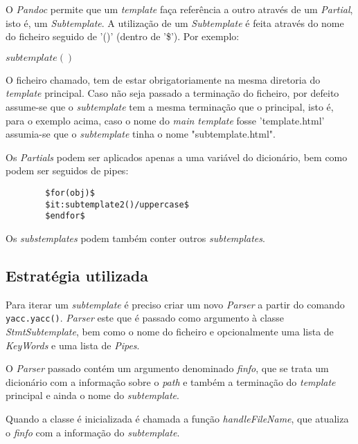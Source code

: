 \documentclass[../relatorio.tex]{subfiles}
\begin{document}
    O \textit{Pandoc} permite que um \textit{template} faça referência a outro
    através de um \textit{Partial}, isto é, um \textit{Subtemplate}. A utilização
    de um \textit{Subtemplate} é feita através do nome do ficheiro seguido de '()'
    (dentro de '\$'). Por exemplo:

    \texttt{$subtemplate()$}

    O ficheiro chamado, tem de estar obrigatoriamente na mesma diretoria do \textit{template}
    principal. Caso não seja passado a terminação do ficheiro, por defeito assume-se que o
    \textit{subtemplate} tem a mesma terminação que o principal, isto é, para o exemplo acima, caso o nome do
    \textit{main template} fosse 'template.html' assumia-se que o \textit{subtemplate} tinha o nome "subtemplate.html".
    
    Os \textit{Partials} podem ser aplicados apenas a uma variável do dicionário, bem como podem ser seguidos de pipes:

    \begin{verbatim}
        $for(obj)$
        $it:subtemplate2()/uppercase$
        $endfor$
    \end{verbatim}

    Os \textit{substemplates} podem também conter outros \textit{subtemplates}.

    \subsection{Estratégia utilizada}

    Para iterar um \textit{subtemplate} é preciso criar um novo \textit{Parser} a partir do
    comando \texttt{yacc.yacc()}. \textit{Parser} este que é passado como argumento
    à classe \textit{StmtSubtemplate}, bem como o nome do ficheiro e opcionalmente uma lista
    de \textit{KeyWords} e uma lista de \textit{Pipes}. 
    
    O \textit{Parser} passado contém um argumento denominado \textit{finfo}, que se trata um dicionário com a informação
    sobre o \textit{path} e também a terminação do \textit{template} principal e ainda o nome do \textit{subtemplate}. 

    Quando a classe é inicializada é chamada a função \textit{handleFileName}, que atualiza o \textit{finfo} com a 
    informação do \textit{subtemplate}.

    \inputminted[firstline=14, lastline=21]{py}{../modules/Stmt/StmtSubtemplate.py}
\end{document}

